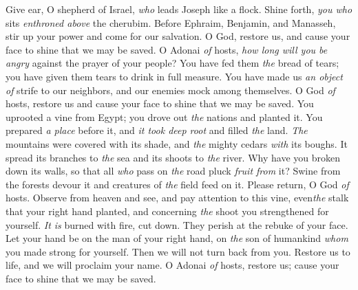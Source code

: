 \begin{biblechapter} %
 Give ear, O shepherd of Israel, 
\textit{who} leads Joseph like a flock. 
Shine forth, \textit{you who} sits \textit{enthroned above} the cherubim.
\verse Before Ephraim, Benjamin, and Manasseh, 
stir up your power 
and come for our salvation.
\verse O God, restore us, 
and cause your face to shine that we may be saved.
\verse O Adonai \textit{of} hosts, 
\textit{how long will you be angry} 
against the prayer of your people?
\verse You have fed them \textit{the} bread of tears; 
you have given them tears to drink in full measure.
\verse You have made us \textit{an object of} strife to our neighbors, 
and our enemies mock among themselves.
\verse O God \textit{of} hosts, restore us 
and cause your face to shine that we may be saved.
\verse You uprooted a vine from Egypt; 
you drove out \textit{the} nations and planted it.
\verse You prepared \textit{a place} before it, 
and \textit{it took deep root} and filled \textit{the} land.
\verse \textit{The} mountains were covered with its shade, 
and \textit{the} mighty cedars \textit{with} its boughs.
\verse It spread its branches to \textit{the} sea 
and its shoots to \textit{the} river.
\verse Why have you broken down its walls, 
so that all \textit{who} pass on \textit{the} road pluck \textit{fruit from} it?
\verse Swine from the forests devour it 
and creatures of \textit{the} field feed on it.
\verse Please return, O God \textit{of} hosts. 
Observe from heaven and see, 
and pay attention to this vine,
\verse even\textit{the} stalk that your right hand planted, 
and concerning \textit{the} shoot you strengthened for yourself.
\verse \textit{It is} burned with fire, cut down. 
They perish at the rebuke of your face.
\verse Let your hand be on the man of your right hand, 
on \textit{the} son of humankind \textit{whom} you made strong for yourself.
\verse Then we will not turn back from you. 
Restore us to life, and we will proclaim your name.
\verse O Adonai \textit{of} hosts, restore us; 
cause your face to shine that we may be saved.
\end{biblechapter}

